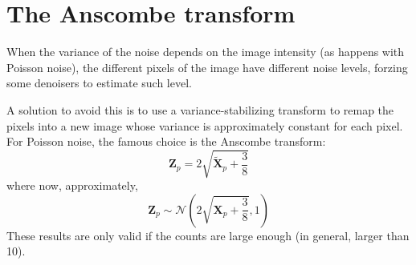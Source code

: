 
\section{The Anscombe transform}
When the variance of the noise depends on the image intensity (as
happens with Poisson noise), the different pixels of the image have
different noise levels, forzing some denoisers to estimate such level.

A solution to avoid this is to use a variance-stabilizing transform to
remap the pixels into a new image whose variance is approximately
constant for each pixel. For Poisson noise, the famous choice is the
Anscombe transform:
\begin{equation}
  \bm{Z}_p=2\sqrt{\tilde{\bm{X}}_p+\frac{3}{8}}
\end{equation}
where now, approximately,
\begin{equation}
  \bm{Z}_p\sim\mathcal{N}(2\sqrt{\bm{X}_p+\frac{3}{8}},1)
\end{equation}
These results are only valid if the counts are large enough (in
general, larger than 10).





